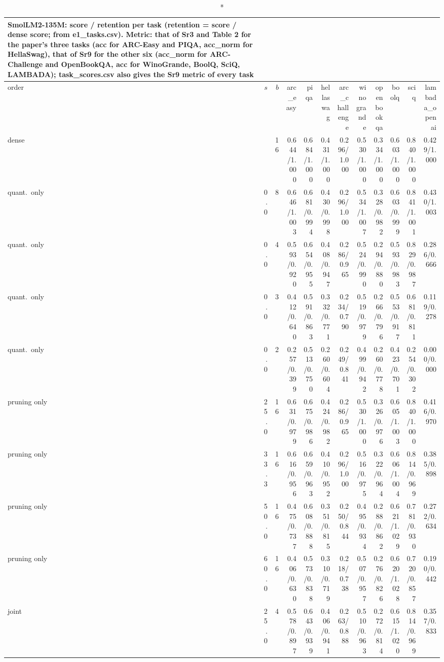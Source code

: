 \documentclass{article}
\begin{document}
\begin{longtable}{lrrrrrrrrrrr}
\caption*{SmolLM2-135M: score / retention per task (retention = score / dense score; from e1\_tasks.csv). Metric: that of Sr3 and Table 2 for the paper's three tasks (acc for ARC-Easy and PIQA, acc\_norm for HellaSwag), that of Sr9 for the other six (acc\_norm for ARC-Challenge and OpenBookQA, acc for WinoGrande, BoolQ, SciQ, LAMBADA); task\_scores.csv also gives the Sr9 metric of every task}\\
\toprule order & $s$ & $b$ & arc\_easy & piqa & hellaswag & arc\_challenge & winogrande & openbookqa & boolq & sciq & lambada\_openai \\ \midrule \endhead
dense &  & 16 & 0.644/1.000 & 0.684/1.000 & 0.431/1.000 & 0.296/1.000 & 0.530/1.000 & 0.334/1.000 & 0.603/1.000 & 0.840/1.000 & 0.429/1.000 \\
quant.\ only & 0.0 & 8 & 0.646/1.003 & 0.681/0.994 & 0.430/0.998 & 0.296/1.000 & 0.534/1.007 & 0.328/0.982 & 0.603/0.999 & 0.841/1.001 & 0.430/1.003 \\
quant.\ only & 0.0 & 4 & 0.593/0.920 & 0.654/0.955 & 0.408/0.947 & 0.286/0.965 & 0.524/0.990 & 0.294/0.880 & 0.593/0.983 & 0.829/0.987 & 0.286/0.666 \\
quant.\ only & 0.0 & 3 & 0.412/0.640 & 0.591/0.863 & 0.332/0.771 & 0.234/0.790 & 0.519/0.979 & 0.266/0.796 & 0.553/0.917 & 0.681/0.811 & 0.119/0.278 \\
quant.\ only & 0.0 & 2 & 0.257/0.399 & 0.513/0.750 & 0.260/0.604 & 0.249/0.841 & 0.499/0.942 & 0.260/0.778 & 0.423/0.701 & 0.254/0.302 & 0.000/0.000 \\
pruning only & 25.0 & 16 & 0.631/0.979 & 0.675/0.986 & 0.424/0.982 & 0.286/0.965 & 0.530/1.000 & 0.326/0.976 & 0.605/1.003 & 0.840/1.000 & 0.416/0.970 \\
pruning only & 33.3 & 16 & 0.616/0.956 & 0.659/0.963 & 0.410/0.952 & 0.296/1.000 & 0.516/0.975 & 0.322/0.964 & 0.606/1.004 & 0.814/0.969 & 0.385/0.898 \\
pruning only & 50.0 & 16 & 0.475/0.737 & 0.608/0.888 & 0.351/0.815 & 0.250/0.844 & 0.495/0.934 & 0.288/0.862 & 0.621/1.029 & 0.781/0.930 & 0.272/0.634 \\
pruning only & 60.0 & 16 & 0.406/0.630 & 0.573/0.838 & 0.310/0.719 & 0.218/0.738 & 0.507/0.957 & 0.276/0.826 & 0.620/1.028 & 0.720/0.857 & 0.190/0.442 \\
joint & 25.0 & 4 & 0.578/0.897 & 0.643/0.939 & 0.406/0.941 & 0.263/0.888 & 0.510/0.963 & 0.272/0.814 & 0.615/1.020 & 0.814/0.969 & 0.357/0.833 \\

\end{longtable}
\end{document}
